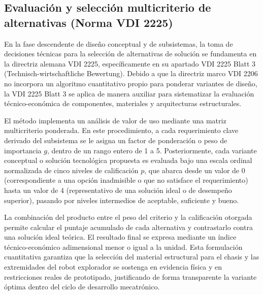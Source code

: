 \subsection{Evaluación y selección multicriterio de alternativas (Norma VDI 2225)}

\noindent
En la fase descendente de diseño conceptual y de subsistemas, la toma de decisiones técnicas para la selección de alternativas de solución se fundamenta en la directriz alemana VDI 2225, específicamente en su apartado VDI 2225 Blatt 3 (Technisch-wirtschaftliche Bewertung). Debido a que la directriz marco VDI 2206 no incorpora un algoritmo cuantitativo propio para ponderar variantes de diseño, la VDI 2225 Blatt 3 se aplica de manera auxiliar para sistematizar la evaluación técnico-económica de componentes, materiales y arquitecturas estructurales.

\noindent
El método implementa un análisis de valor de uso mediante una matriz multicriterio ponderada. En este procedimiento, a cada requerimiento clave derivado del subsistema se le asigna un factor de ponderación o peso de importancia $g$, dentro de un rango entero de 1 a 5. Posteriormente, cada variante conceptual o solución tecnológica propuesta es evaluada bajo una escala ordinal normalizada de cinco niveles de calificación $p$, que abarca desde un valor de 0 (correspondiente a una opción inadmisible o que no satisface el requerimiento) hasta un valor de 4 (representativo de una solución ideal o de desempeño superior), pasando por niveles intermedios de aceptable, suficiente y bueno.

\noindent
La combinación del producto entre el peso del criterio y la calificación otorgada permite calcular el puntaje acumulado de cada alternativa y contrastarlo contra una solución ideal teórica. El resultado final se expresa mediante un índice técnico-económico adimensional menor o igual a la unidad. Esta formulación cuantitativa garantiza que la selección del material estructural para el chasis y las extremidades del robot explorador se sostenga en evidencia física y en restricciones reales de prototipado, justificando de forma transparente la variante óptima dentro del ciclo de desarrollo mecatrónico.